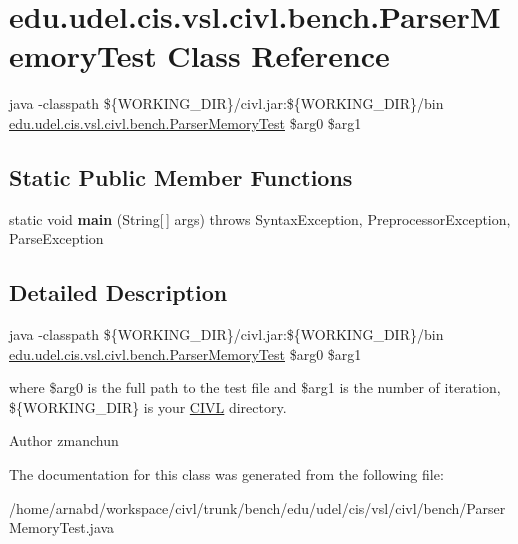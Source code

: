 \hypertarget{classedu_1_1udel_1_1cis_1_1vsl_1_1civl_1_1bench_1_1ParserMemoryTest}{}\section{edu.\+udel.\+cis.\+vsl.\+civl.\+bench.\+Parser\+Memory\+Test Class Reference}
\label{classedu_1_1udel_1_1cis_1_1vsl_1_1civl_1_1bench_1_1ParserMemoryTest}


java -\/classpath \$\{W\+O\+R\+K\+I\+N\+G\+\_\+\+D\+I\+R\}/civl.jar\+:\$\{W\+O\+R\+K\+I\+N\+G\+\_\+\+D\+I\+R\}/bin \hyperlink{classedu_1_1udel_1_1cis_1_1vsl_1_1civl_1_1bench_1_1ParserMemoryTest}{edu.\+udel.\+cis.\+vsl.\+civl.\+bench.\+Parser\+Memory\+Test} \$arg0 \$arg1  


\subsection*{Static Public Member Functions}
\begin{DoxyCompactItemize}
\item 
\hypertarget{classedu_1_1udel_1_1cis_1_1vsl_1_1civl_1_1bench_1_1ParserMemoryTest_ac39a5240e742129820c3f946a2037d9f}{}static void {\bfseries main} (String\mbox{[}$\,$\mbox{]} args)  throws Syntax\+Exception, 			\+Preprocessor\+Exception, Parse\+Exception \label{classedu_1_1udel_1_1cis_1_1vsl_1_1civl_1_1bench_1_1ParserMemoryTest_ac39a5240e742129820c3f946a2037d9f}

\end{DoxyCompactItemize}


\subsection{Detailed Description}
java -\/classpath \$\{W\+O\+R\+K\+I\+N\+G\+\_\+\+D\+I\+R\}/civl.jar\+:\$\{W\+O\+R\+K\+I\+N\+G\+\_\+\+D\+I\+R\}/bin \hyperlink{classedu_1_1udel_1_1cis_1_1vsl_1_1civl_1_1bench_1_1ParserMemoryTest}{edu.\+udel.\+cis.\+vsl.\+civl.\+bench.\+Parser\+Memory\+Test} \$arg0 \$arg1 

where \$arg0 is the full path to the test file and \$arg1 is the number of iteration, \$\{W\+O\+R\+K\+I\+N\+G\+\_\+\+D\+I\+R\} is your \hyperlink{classedu_1_1udel_1_1cis_1_1vsl_1_1civl_1_1CIVL}{C\+I\+V\+L} directory.

\begin{DoxyAuthor}{Author}
zmanchun 
\end{DoxyAuthor}


The documentation for this class was generated from the following file\+:\begin{DoxyCompactItemize}
\item 
/home/arnabd/workspace/civl/trunk/bench/edu/udel/cis/vsl/civl/bench/Parser\+Memory\+Test.\+java\end{DoxyCompactItemize}
